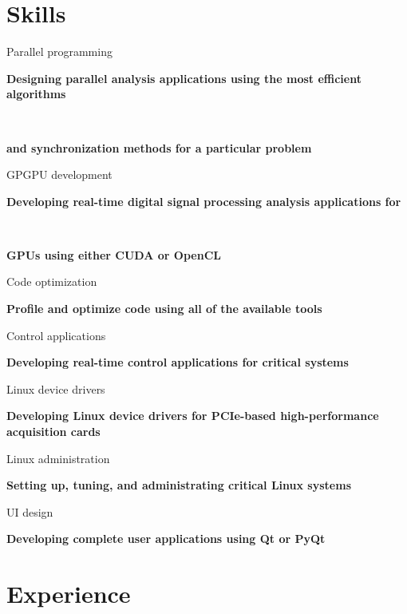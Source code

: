 \documentclass[]{cv-style}          %
\begin{document}
\section{Skills}
  \vspace{-0.2cm}
\begin{entrylist}
\parbox[t]{3.7cm}{Parallel programming}  \textbf{Designing parallel analysis applications using the most efficient algorithms} \\
 \vspace{\parsep}
 \parbox[t]{3.7cm}{ ~}	\textbf{and synchronization methods for a particular problem} \\
  \parbox[t]{3.7cm}{GPGPU development}  \textbf{Developing real-time digital signal processing analysis applications for} \\
 \vspace{\parsep}
 \parbox[t]{3.7cm}{ ~}	\textbf{GPUs using either CUDA or OpenCL} \\
 \vspace{\parsep}
   \parbox[t]{3.7cm}{Code optimization}  \textbf{Profile and optimize code using all of the available tools} \\
   \vspace{\parsep}
   \parbox[t]{3.7cm}{Control applications}  \textbf{Developing real-time control applications for critical systems} \\
 \vspace{\parsep}
   \parbox[t]{3.7cm}{Linux device drivers}  \textbf{Developing Linux device drivers for PCIe-based high-performance acquisition cards} \\
  \vspace{\parsep}
  \parbox[t]{3.7cm}{Linux administration}  \textbf{Setting up, tuning, and administrating critical Linux systems} \\
  
  \parbox[t]{3.7cm}{UI design}  \textbf{Developing complete user applications using Qt or PyQt} \\
 


\end{entrylist}


\parskip=1pt 
\section{Experience}
\end{document}
